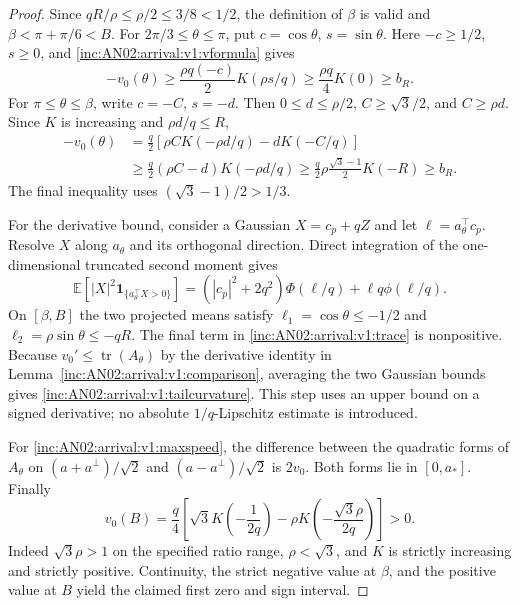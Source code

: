 \documentclass[11pt]{article}
\numberwithin{equation}{section}
\theoremstyle{remark}
\newcommand{\E}{\mathbb E}
\newcommand{\ind}{\mathbf1}
\DeclareMathOperator{\tr}{tr}
\begin{document}
\begin{proof}
Since $qR/\rho\le\rho/2\le3/8<1/2$, the definition of $\beta$ is valid
and $\beta<\pi+\pi/6<B$. For
$2\pi/3\le\theta\le\pi$, put $c=\cos\theta$, $s=\sin\theta$.
Here $-c\ge1/2$, $s\ge0$, and \eqref{inc:AN02:arrival:v1:vformula} gives
\[
 -v_0(\theta)\ge\frac{\rho q(-c)}2 K(\rho s/q)
 \ge\frac{\rho q}4K(0)\ge b_R.
\]
For $\pi\le\theta\le\beta$, write $c=-C$, $s=-d$.
Then $0\le d\le\rho/2$, $C\ge\sqrt3/2$, and $C\ge\rho d$.
Since $K$ is increasing and $\rho d/q\le R$,
\begin{align*}
 -v_0(\theta)
 &=\frac q2[\rho C K(-\rho d/q)-dK(-C/q)]\\
 &\ge\frac q2(\rho C-d)K(-\rho d/q)
 \ge\frac q2\rho\frac{\sqrt3-1}{2}K(-R)
 \ge b_R.
\end{align*}
The final inequality uses $(\sqrt3-1)/2>1/3$.

For the derivative bound, consider a Gaussian $X=c_p+qZ$ and let
$\ell=a_\theta^\top c_p$. Resolve $X$ along $a_\theta$ and its
orthogonal direction. Direct integration of the one-dimensional
truncated second moment gives
\begin{equation}\label{inc:AN02:arrival:v1:trace}
 \E[|X|^2\ind_{\{a_\theta^\top X>0\}}]
 =(|c_p|^2+2q^2)\Phi(\ell/q)+\ell q\phi(\ell/q).
\end{equation}
On $[\beta,B]$ the two projected means satisfy
$\ell_1=\cos\theta\le-1/2$ and
$\ell_2=\rho\sin\theta\le-qR$.
The final term in \eqref{inc:AN02:arrival:v1:trace} is nonpositive.
Because $v_0'\le\tr(A_\theta)$ by the derivative identity in
Lemma~\ref{inc:AN02:arrival:v1:comparison}, averaging the two Gaussian
bounds gives \eqref{inc:AN02:arrival:v1:tailcurvature}.
This step uses an upper bound on a signed derivative; no absolute
$1/q$-Lipschitz estimate is introduced.

For \eqref{inc:AN02:arrival:v1:maxspeed}, the difference between the
quadratic forms of $A_\theta$ on
$(a+a^\perp)/\sqrt2$ and $(a-a^\perp)/\sqrt2$ is $2v_0$.
Both forms lie in $[0,a_*]$.
Finally
\[
 v_0(B)=\frac q4\left[
 \sqrt3 K\!\left(-\frac1{2q}\right)
 -\rho K\!\left(-\frac{\sqrt3\rho}{2q}\right)\right]>0.
\]
Indeed $\sqrt3\rho>1$ on the specified ratio range, $\rho<\sqrt3$,
and $K$ is strictly increasing and strictly positive.
Continuity, the strict negative value at $\beta$, and the positive value
at $B$ yield the claimed first zero and sign interval.
\end{proof}
\end{document}
